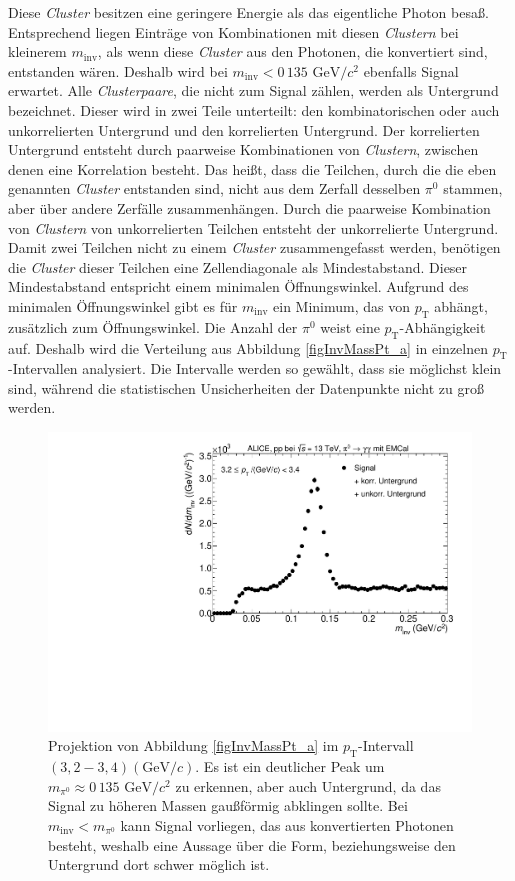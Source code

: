 Diese \textit{Cluster} besitzen eine geringere Energie als das eigentliche Photon besaß.
Entsprechend liegen Einträge von Kombinationen mit diesen \textit{Clustern} bei kleinerem $m_\text{inv}$, als wenn diese \textit{Cluster} aus den Photonen, die konvertiert sind, entstanden wären.
Deshalb wird bei $m_\text{inv}<0\,135\text{ GeV}/c^{2}$ ebenfalls Signal erwartet.
\newline
Alle \textit{Clusterpaare}, die nicht zum Signal zählen, werden als Untergrund bezeichnet.
Dieser wird in zwei Teile unterteilt: den kombinatorischen oder auch unkorrelierten Untergrund und den korrelierten Untergrund.
Der korrelierten Untergrund entsteht durch paarweise Kombinationen von \textit{Clustern}, zwischen denen eine Korrelation besteht.
Das heißt, dass die Teilchen, durch die die eben genannten \textit{Cluster} entstanden sind, nicht aus dem Zerfall desselben $\pi^{0}$ stammen, aber über andere Zerfälle zusammenhängen.
Durch die paarweise Kombination von \textit{Clustern} von unkorrelierten Teilchen entsteht der unkorrelierte Untergrund.
\newline
Damit zwei Teilchen nicht zu einem \textit{Cluster} zusammengefasst werden, benötigen die \textit{Cluster} dieser Teilchen eine Zellendiagonale als Mindestabstand.
Dieser Mindestabstand entspricht einem minimalen Öffnungswinkel.
Aufgrund des minimalen Öffnungswinkel gibt es für $m_\text{inv}$ ein Minimum, das von $p_\text{T}$ abhängt, zusätzlich zum Öffnungswinkel.
\newline
Die Anzahl der $\pi^{0}$ weist eine $p_{\text{T}}$-Abhängigkeit auf.
Deshalb wird die Verteilung aus Abbildung \ref{figInvMassPt_a} in einzelnen $p_{\text{T}}$-Intervallen analysiert.
Die Intervalle werden so gewählt, dass sie möglichst klein sind, während die statistischen Unsicherheiten der Datenpunkte nicht zu groß werden.
\begin{figure}[tbp]
\centering
\includegraphics[width=.75\linewidth]{hSignalPlusBkg.pdf}
\caption{Projektion von Abbildung \ref{figInvMassPt_a} im $p_{\text{T}}$-Intervall $(3,2 - 3,4) (\text{GeV/}c)$. Es ist ein deutlicher Peak um $m_{\pi^{0}} \approx 0\,135\text{ GeV/}c^{2}$ zu erkennen, aber auch Untergrund, da das Signal zu höheren Massen gaußförmig abklingen sollte. Bei $m_{\text{inv}} < m_{\pi^{0}}$ kann Signal vorliegen, das aus konvertierten Photonen besteht, weshalb eine Aussage über die Form, beziehungsweise den Untergrund dort schwer möglich ist.}
\label{figSignalPlusBkg}
\end{figure}
